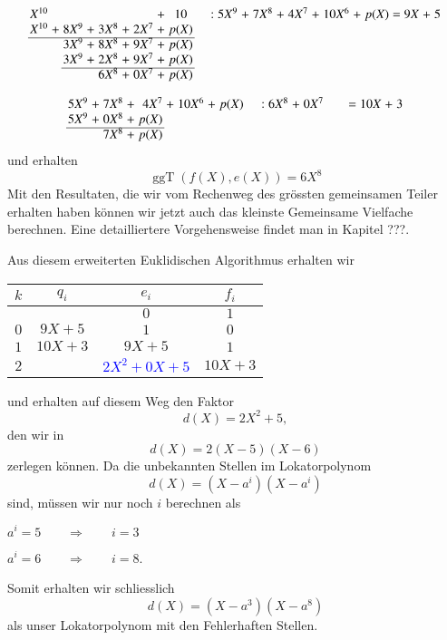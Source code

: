 \[
\arraycolsep=1.4pt
\begin{array}{rcrcrcrcccrcrcrcrcrcrcrcrcr}
	X^{10}& & & & & & &+& 10& & & & &:&5X^9&+&7X^8&+& 4X^7&+&10X^6&+&p(X)&=&9X&+&5\\
	X^{10}&+& 8X^9&+& 3X^8&+&2X^7&+& p(X)& &  & & & &   & & & & & &   & &  & & \\ \cline{1-9}
	&& 3X^9&+& 8X^8&+& 9X^7&+& p(X)& &   & & & & & &   & &  & & \\
	&& 3X^9&+& 2X^8&+& 9X^7&+& p(X)& &   & & & & & &   & &  & & \\ \cline{3-9}
	& &    & &6X^8&+&0X^7&+&p(X)& &   & & & & & &   & &  & & \\
\end{array}
\]

\[
\arraycolsep=1.4pt
\begin{array}{rcrcrcrcccrcrcrcrcrcrcrcrcr}
	5X^9&+& 7X^8&+& 4X^7&+& 10X^6&+& p(X)& & & & &:&6X^8&+&0X^7& & & & & & &=&10X&+&3\\
	5X^9&+& 0X^8&+& p(X)& & & & & &  & & & &   & & & & & &   & &  & & \\ \cline{1-5}
	&& 7X^8&+& p(X)& & & & & &   & & & & & &   & &  & & \\
\end{array}
\]
und erhalten
\[
\operatorname{ggT}(f(X),e(X)) = 6X^8
\]
Mit den Resultaten, die wir vom Rechenweg des grössten gemeinsamen Teiler erhalten haben können wir jetzt auch das kleinste Gemeinsame Vielfache berechnen. Eine detailliertere Vorgehensweise findet man in Kapitel ???. 

Aus diesem erweiterten Euklidischen Algorithmus erhalten wir 
\begin{center}
	
	\begin{tabular}{| c | c | c c |}
		\hline
		$k$ &  $q_i$ & $e_i$ & $f_i$\\
		\hline 
		& & $0$& $1$\\
		$0$& $9X + 5$& $1$& $0$\\
		$1$& $10X + 3$& $9X+5$& $1$\\
		$2$& & \textcolor{blue}{$2X^2 + 0X + 5$}& $10X + 3$\\
		\hline
	\end{tabular}	
	
\end{center}
und erhalten auf diesem Weg den Faktor
\[
d(X) = 2X^2 + 5,
\]
den wir in 
\[
d(X) = 2(X-5)(X-6)
\]
zerlegen können.
Da die unbekannten Stellen im Lokatorpolynom
\[
d(X) = (X-a^i)(X-a^i)
\]
sind, müssen wir nur noch $i$ berechnen als
\begin{center}
	$a^i = 5 \qquad \Rightarrow \qquad i = 3$
	
	$a^i = 6 \qquad \Rightarrow \qquad i = 8$.
\end{center}

Somit erhalten wir schliesslich
\[
d(X) = (X-a^3)(X-a^8)
\]
als unser Lokatorpolynom mit den Fehlerhaften Stellen.